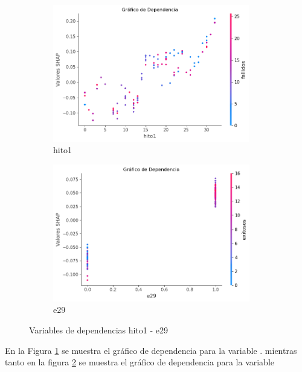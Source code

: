 \begin{figure}[H]
    
    \begin{subfigure}{0.5\textwidth}
        \includegraphics[width=0.9\linewidth, height=6cm]{img/shap_rf/hito1.png}
        \caption{hito1}
        \label{fig:dependencia_hito1}
    \end{subfigure}
    \begin{subfigure}{0.5\textwidth}
        \includegraphics[width=0.9\linewidth, height=6cm]{img/shap_rf/e29.png}
        \caption{e29}
        \label{fig:dependencia_e29}
    \end{subfigure}

    \caption{Variables de dependencias hito1 - e29}
    \label{fig:image2}
\end{figure}

En la Figura \ref{fig:dependencia_hito1} se muestra el gráfico de dependencia para la variable . mientras tanto en la figura \ref{fig:dependencia_e29} se muestra el gráfico de dependencia para la variable 

